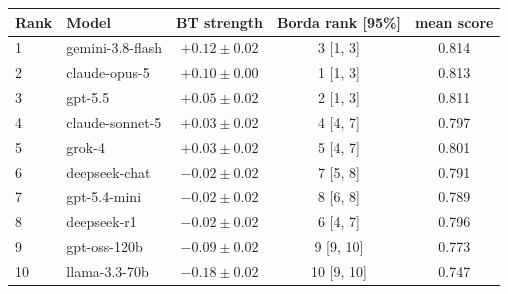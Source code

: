 \begin{tabular}{llccc}
\toprule
Rank & Model & BT strength & Borda rank [95\%] & mean score \\
\midrule
1 & gemini-3.8-flash & $+0.12 \pm 0.02$ & 3 [1, 3] & 0.814 \\
2 & claude-opus-5 & $+0.10 \pm 0.00$ & 1 [1, 3] & 0.813 \\
3 & gpt-5.5 & $+0.05 \pm 0.02$ & 2 [1, 3] & 0.811 \\
4 & claude-sonnet-5 & $+0.03 \pm 0.02$ & 4 [4, 7] & 0.797 \\
5 & grok-4 & $+0.03 \pm 0.02$ & 5 [4, 7] & 0.801 \\
6 & deepseek-chat & $-0.02 \pm 0.02$ & 7 [5, 8] & 0.791 \\
7 & gpt-5.4-mini & $-0.02 \pm 0.02$ & 8 [6, 8] & 0.789 \\
8 & deepseek-r1 & $-0.02 \pm 0.02$ & 6 [4, 7] & 0.796 \\
9 & gpt-oss-120b & $-0.09 \pm 0.02$ & 9 [9, 10] & 0.773 \\
10 & llama-3.3-70b & $-0.18 \pm 0.02$ & 10 [9, 10] & 0.747 \\
\bottomrule
\end{tabular}
